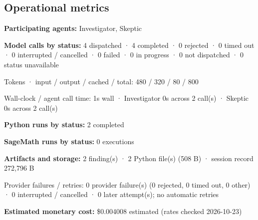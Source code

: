 \documentclass[11pt]{article}
\begin{document}
\subsection{Operational metrics}
\textbf{Participating agents:} Investigator, Skeptic\par
\textbf{Model calls by status:} 4 dispatched · 4 completed · 0 rejected · 0 timed out · 0 interrupted / cancelled · 0 failed · 0 in progress · 0 not dispatched · 0 status unavailable\par
Tokens · input / output / cached / total: 480 / 320 / 80 / 800\par
Wall-clock / agent call time: 1s wall · Investigator 0s across 2 call(s) · Skeptic 0s across 2 call(s)\par
\textbf{Python runs by status:} 2 completed\par
\textbf{SageMath runs by status:} 0 executions\par
\textbf{Artifacts and storage:} 2 finding(s) · 2 Python file(s) (508 B) · session record 272,796 B\par
Provider failures / retries: 0 provider failure(s) (0 rejected, 0 timed out, 0 other) · 0 interrupted / cancelled · 0 later attempt(s); no automatic retries\par
\textbf{Estimated monetary cost:} \$0.004008 estimated (rates checked 2026-10-23)\par
\end{document}
